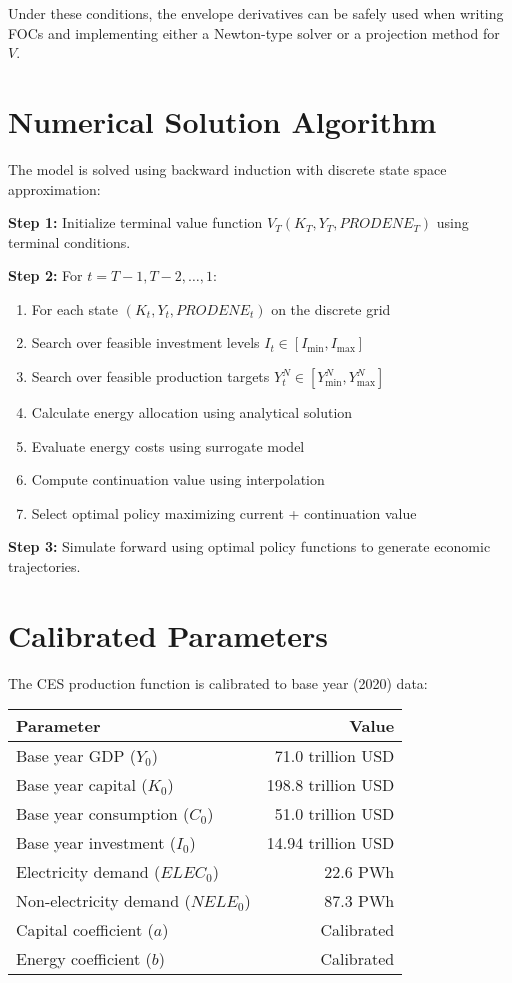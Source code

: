 \documentclass{article}
\begin{document}
Under these conditions, the envelope derivatives can be safely used when writing FOCs and implementing either a Newton-type solver or a projection method for $V$.

\section{Numerical Solution Algorithm}

The model is solved using backward induction with discrete state space approximation:

\textbf{Step 1:} Initialize terminal value function $V_T(K_T, Y_T, PRODENE_T)$ using terminal conditions.

\textbf{Step 2:} For $t = T-1, T-2, \ldots, 1$:
\begin{enumerate}
\item For each state $(K_t, Y_t, PRODENE_t)$ on the discrete grid
\item Search over feasible investment levels $I_t \in [I_{\min}, I_{\max}]$
\item Search over feasible production targets $Y_t^N \in [Y^N_{\min}, Y^N_{\max}]$
\item Calculate energy allocation using analytical solution
\item Evaluate energy costs using surrogate model
\item Compute continuation value using interpolation
\item Select optimal policy maximizing current + continuation value
\end{enumerate}

\textbf{Step 3:} Simulate forward using optimal policy functions to generate economic trajectories.

\section{Calibrated Parameters}

The CES production function is calibrated to base year (2020) data:

\begin{center}
\begin{tabular}{lr}
\toprule
Parameter & Value \\
\midrule
Base year GDP ($Y_0$) & 71.0 trillion USD \\
Base year capital ($K_0$) & 198.8 trillion USD \\
Base year consumption ($C_0$) & 51.0 trillion USD \\
Base year investment ($I_0$) & 14.94 trillion USD \\
Electricity demand ($ELEC_0$) & 22.6 PWh \\
Non-electricity demand ($NELE_0$) & 87.3 PWh \\
Capital coefficient ($a$) & Calibrated \\
Energy coefficient ($b$) & Calibrated \\
\bottomrule
\end{tabular}
\end{center}
\end{document}
